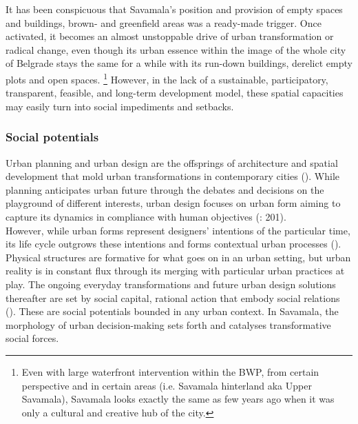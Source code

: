 \documentclass[11pt]{report}
\begin{document}
It has been conspicuous that Savamala's position and provision of empty spaces and buildings, brown- and greenfield areas was a ready-made trigger.
Once activated, it becomes an almost unstoppable drive of urban transformation or radical change, even though its urban essence within the image of the whole city of Belgrade stays the same for a while with its run-down buildings, derelict empty plots and open spaces.
\footnote{Even with large waterfront intervention within the BWP, from certain perspective and in certain areas (i.e. Savamala hinterland aka Upper Savamala), Savamala looks exactly the same as few years ago when it was only a cultural and creative hub of the city.}
However, in the lack of a sustainable, participatory, transparent, feasible, and long-term development model, these spatial capacities may easily turn into social impediments and setbacks.

\subsubsection{Social potentials}

Urban planning and urban design are the offsprings of architecture and spatial development that mold urban transformations in contemporary cities (\cite{Rode2006}).
While planning anticipates urban future through the debates and decisions on the playground of different interests, urban design focuses on urban form aiming to capture its dynamics in compliance with human objectives (\cite{(LynchAndRodwin1958}: 201).
\\

However, while urban forms represent designers' intentions of the particular time, its life cycle outgrows these intentions and forms contextual urban processes (\cite{Tonkiss2014}).
Physical structures are formative for what goes on in an urban setting, but urban reality is in constant flux through its merging with particular urban practices at play.
The ongoing everyday transformations and future urban design solutions thereafter are set by social capital, rational action that embody social relations (\cite{Coleman1988}).
These are social potentials bounded in any urban context.
In Savamala, the morphology of urban decision-making sets forth and catalyses transformative social forces.
\\
\end{document}
